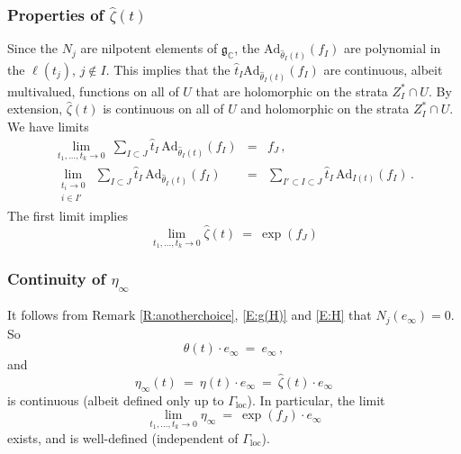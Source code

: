 \documentclass[12pt]{amsart}
\numberwithin{equation}{section}
\numberwithin{table}{section}
\def\z{\zeta}
\def\tAd{\mathrm{Ad}}
\def\bC{\mathbb{C}}
\def\fg{\mathfrak{g}}
\theoremstyle{definition}
\theoremstyle{definition}
\theoremstyle{remark}
\begin{document}
\subsubsection{Properties of $\hat\z(t)$}\label{S:a}

Since the $N_j$ are nilpotent elements of $\fg_\bC$, the $\tAd_{\hat\theta_I(t)}(f_I)$ are polynomial in the $\ell(t_j)$, $j \not\in I$.  This implies that the $\hat t_I \tAd_{\hat\theta_I(t)}(f_I)$ are continuous, albeit multivalued, functions on all of $U$ that are holomorphic on the strata $Z_I^* \cap U$.  By extension, $\hat\z(t)$ is continuous on all of $U$ and holomorphic on the strata $Z_I^* \cap U$.  We have limits
\begin{eqnarray*}
  \lim_{t_1,\ldots,t_k\to0} \
  \sum_{I \subset J} \hat t_I\,\tAd_{\hat\theta_I(t)}(f_I)
  & = & f_J \,,\\
  \lim_{\substack{t_i\to0 \\ i\in I' }} \
  \sum_{I \subset J} \hat t_I\,\tAd_{\hat\theta_I(t)}(f_I)
  & = & 
  \sum_{I' \subset I \subset J} \hat t_I\,\tAd_{I(t)}(f_I)
  \,.
\end{eqnarray*}
The first limit implies
\begin{equation}\label{E:lima}
  \lim_{t_1,\ldots,t_k\to0} 
  \hat\z(t) \ = \ \exp(f_J)
\end{equation}

\subsubsection{Continuity of $\eta_\infty$} \label{S:eta-infty}

It follows from Remark \ref{R:anotherchoice}, \eqref{E:g(H)} and \eqref{E:H} that $N_j(e_\infty) = 0$.  So
\[
  \theta(t) \cdot e_\infty \ = \ e_\infty \,,
\]
and
\begin{equation}\label{E:eta-infty}
  \eta_\infty(t) \ = \ \eta(t) \cdot e_\infty
  \ = \ \hat\z(t) \cdot e_\infty 
\end{equation}
is continuous (albeit defined only up to $\Gamma_\mathrm{loc}$).  In particular, the limit 
\begin{equation}\label{E:liminfty}
  \lim_{t_1,\ldots,t_k\to0} \eta_\infty
  \ = \ \exp(f_J) \cdot e_\infty
\end{equation}
exists, and is well-defined (independent of $\Gamma_\mathrm{loc}$).
\end{document}
